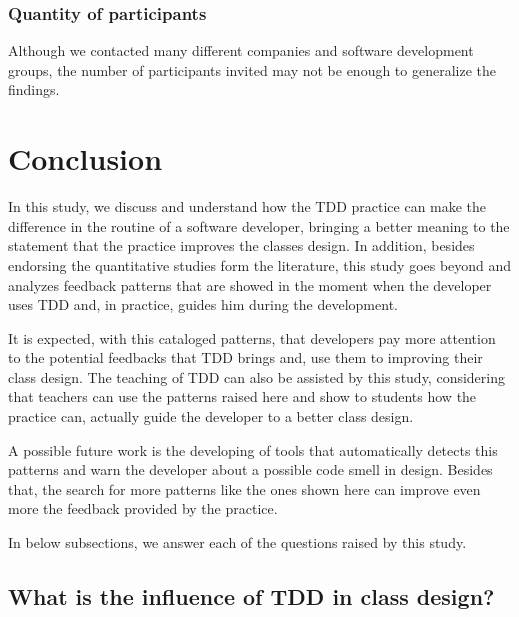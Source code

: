 \documentclass[conference]{IEEEtran}
\begin{document}
\subsubsection{Quantity of participants}

Although we contacted many different companies and software development groups,
the number of participants invited may not be enough to generalize the findings.

\section{Conclusion}


In this study, we discuss and understand how the TDD practice can make the
difference in the routine of a software developer, bringing a better meaning
to the statement that the practice improves the classes design.
In addition, besides endorsing the quantitative studies form the literature, this study
goes beyond and analyzes feedback patterns that are showed in the moment when
the developer uses TDD and, in practice, guides him during the development.

It is expected, with this cataloged patterns, that developers pay more attention
to the potential feedbacks that TDD brings and, use them to improving their class
design. The teaching of TDD can also be assisted by this study, considering
that teachers can use the patterns raised here and show to students
how the practice can, actually guide the developer to a better class design.


A possible future work is the developing of tools that automatically detects this patterns
and warn the developer about a possible code smell in design. Besides that,
the search for more patterns like the ones shown here can improve even more the feedback
provided by the practice.

In below subsections, we answer each of the questions raised by this study.

\subsection{What is the influence of TDD in class design?}
\end{document}
